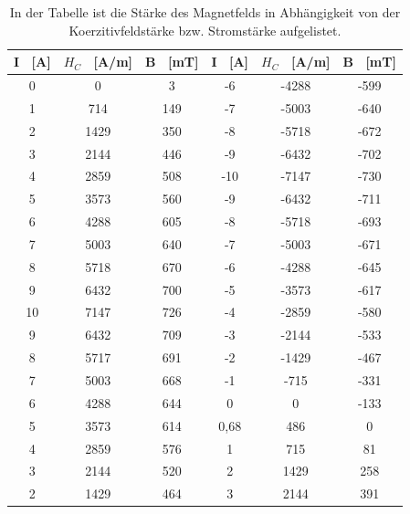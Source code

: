 \documentclass[titlepage = firstcover]{scrartcl}
\begin{document}
            \begin{table}[h]
                \centering 
                \caption{In der Tabelle ist die Stärke des Magnetfelds in Abhängigkeit von der Koerzitivfeldstärke bzw. Stromstärke aufgelistet.}
                \label{tab:Hysterese}
    
                \begin{tabular}{c c c c c c}
                    \toprule
                    {I \ [A]} & {$H_C$ \ [A/m]} & {B \ [mT]} & {I \ [A]} & {$H_C$ \ [A/m]} & {B \ [mT]} \\
                    \midrule
                    0 &     0 & 3          & -6   & -4288& -599 \\
                    1 &    714&      149   & -7   & -5003& -640 \\
                    2 &    1429&     350   & -8   & -5718& -672 \\
                    3 &     2144   & 446   & -9   & -6432& -702 \\
                    4 &     2859   & 508   & -10  & -7147& -730 \\
                    5 &     3573   & 560   & -9   & -6432& -711 \\
                    6 &     4288   & 605   & -8   & -5718& -693 \\
                    7 &     5003   & 640   & -7   & -5003& -671 \\
                    8 &     5718   & 670   & -6   & -4288& -645 \\
                    9 &     6432   & 700   & -5   & -3573& -617 \\
                    10 &    7147   & 726  & -4    & -2859& -580 \\
                    9 &     6432   & 709   & -3   & -2144& -533 \\
                    8 &     5717   & 691   & -2   & -1429& -467 \\
                    7 &     5003   & 668   & -1   & -715 & -331 \\
                    6 &     4288   & 644   &  0   &  0   & -133 \\
                    5 &     3573   & 614   & 0,68 &  486 &    0 \\
                    4 &     2859   & 576   & 1    &  715 &   81 \\
                    3 &     2144   & 520   & 2    &  1429&  258 \\
                    2 &     1429   & 464   & 3    &  2144&  391 \\

\end{tabular}
\end{table}
\end{document}
